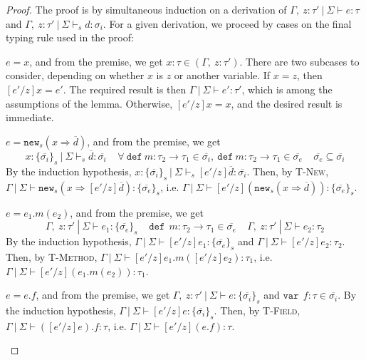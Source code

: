 \documentclass{llncs}
\newcommand{\keywadj}[1]{\mathtt{#1}}
\newcommand{\keyw}[1]{\keywadj{#1}~}
\newcommand{\pcase}[1][]{
  \if\relax\detokenize{#1}\relax
    \def\thiscase{}
  \else
    \def\thiscase{~#1}
  \fi
  \item
}
\begin{document}
\begin{proof} The proof is by simultaneous induction on a derivation of $\Gamma,~z : \tau'~|~\Sigma \vdash e : \tau$ and $\Gamma,~z : \tau'~|~\Sigma \vdash_s d : \sigma_i$. For a given derivation, we proceed by cases on the final typing rule used in the proof:

\begin{pcases}
\pcase[\textsc{T-Var}]
$e = x$, and from the premise, we get $x : \tau \in (\Gamma,~z : \tau')$. There are two subcases to consider, depending on whether $x$ is $z$ or another variable. If $x = z$, then $[e'/z]x = e'$. The required result is then $\Gamma~|~\Sigma \vdash e' : \tau'$, which is among the assumptions of the lemma. Otherwise, $[e'/z]x = x$, and the desired result is immediate.
\\
\pcase[\textsc{T-New}]
$e = \keywadj{new}_{s}(x \Rightarrow \overline{d})$, and from the premise, we get
\[
x : \{ \overline{\sigma_i} \}_{s}~|~\Sigma \vdash_s \overline{d} : \overline{\sigma_i}~~~~~\forall~\keyw{def} m : \tau_2 \rightarrow \tau_1 \in \overline{\sigma_i},~\keyw{def} m : \tau_2 \rightarrow \tau_1 \in \overline{\sigma_e}~~~~~\overline{\sigma_e} \subseteq \overline{\sigma_i}
\]
By the induction hypothesis, $x : \{ \overline{\sigma_i} \}_{s}~|~\Sigma \vdash_s [e'/z]\overline{d} : \overline{\sigma_i}$. Then, by \textsc{T-New}, $\Gamma~|~\Sigma \vdash \keywadj{new}_{s}(x \Rightarrow [e'/z]\overline{d}) : \{ \overline{\sigma_e} \}_{s}$, i.e. $\Gamma~|~\Sigma \vdash [e'/z](\keywadj{new}_{s}(x \Rightarrow \overline{d})) : \{ \overline{\sigma_e} \}_{s}$.
\\
\pcase[\textsc{T-Method}]
$e = e_1.m(e_2)$, and from the premise, we get
\[
\Gamma,~z : \tau'~|~\Sigma \vdash e_1 : \{ \overline{\sigma_e} \}_s~~~~~\keyw{def}~ m : \tau_2 \rightarrow \tau_1 \in \overline{\sigma_e}~~~~~\Gamma,~z : \tau'~|~\Sigma \vdash e_2 : \tau_2
\]
By the induction hypothesis, $\Gamma~|~\Sigma \vdash [e'/z]e_1 : \{ \overline{\sigma_e} \}_s$ and $\Gamma~|~\Sigma \vdash [e'/z]e_2 : \tau_2$. Then, by \textsc{T-Method}, $\Gamma~|~\Sigma \vdash [e'/z]e_1.m([e'/z]e_2) : \tau_1$, i.e. $\Gamma~|~\Sigma \vdash [e'/z](e_1.m(e_2)) : \tau_1$.
\\
\pcase[\textsc{T-Field}]
$e = e.f$, and from the premise, we get $\Gamma,~z : \tau'~|~\Sigma \vdash e : \{ \overline{\sigma_i} \}_s$ and $\keyw{var}~ f : \tau \in \overline{\sigma_i}$. By the induction hypothesis, $\Gamma~|~\Sigma \vdash [e'/z]e : \{ \overline{\sigma_i} \}_s$. Then, by \textsc{T-Field}, $\Gamma~|~\Sigma \vdash ([e'/z]e).f : \tau$, i.e. $\Gamma~|~\Sigma \vdash [e'/z](e.f) : \tau$.

\end{pcases}
\end{proof}
\end{document}

